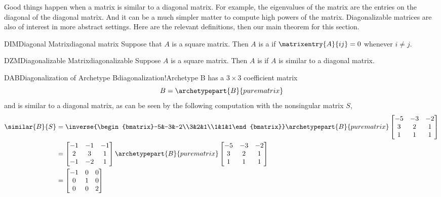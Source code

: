 %
%
%
Good things happen when a matrix is similar to a diagonal matrix.  For example, the eigenvalues of the matrix are the  entries on the diagonal of the diagonal matrix.  And it can be a much simpler matter to compute high powers of the matrix.  Diagonalizable matrices are also of interest in more abstract settings.  Here are the relevant definitions, then our main theorem for this section.
%
\begin{definition}{DIM}{Diagonal Matrix}{diagonal matrix}
Suppose that $A$ is a square matrix.  Then $A$ is a  if $\matrixentry{A}{ij}=0$ whenever $i\neq j$.
\end{definition}
%
%
\begin{definition}{DZM}{Diagonalizable Matrix}{diagonalizable}
Suppose $A$ is a square matrix.  Then $A$ is  if $A$ is similar to a diagonal matrix.
\end{definition}
%
%
\begin{example}{DAB}{Diagonalization of Archetype B}{diagonalization!Archetype B}
%
 has a $3\times 3$ coefficient matrix
%
%
\begin{equation*}
B=\archetypepart{B}{purematrix}
\end{equation*}
%
and is similar to a diagonal matrix, as can be seen by the following computation with the nonsingular matrix $S$,
%
\begin{align*}
\similar{B}{S}&=
\inverse{\begin{bmatrix}-5&-3&-2\\3&2&1\\1&1&1\end{bmatrix}}
\archetypepart{B}{purematrix}
\begin{bmatrix}-5&-3&-2\\3&2&1\\1&1&1\end{bmatrix}\\
%
&=\begin{bmatrix}-1&-1&-1\\2&3&1\\-1&-2&1\end{bmatrix}
\archetypepart{B}{purematrix}
\begin{bmatrix}-5&-3&-2\\3&2&1\\1&1&1\end{bmatrix}\\
%
&=
\begin{bmatrix}-1&0&0\\0&1&0\\0&0&2\end{bmatrix}
%
\end{align*}
%
\end{example}
